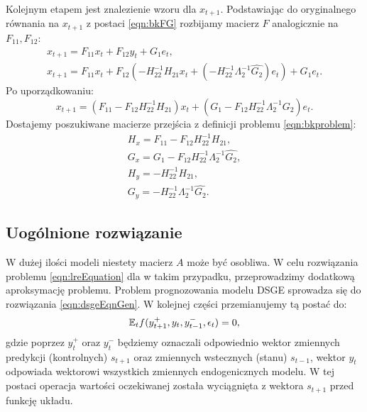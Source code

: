 Kolejnym etapem jest znalezienie wzoru dla $x_{t+1}$. Podstawiając do oryginalnego równania na $x_{t+1}$ z postaci \eqref{eqn:bkFG} rozbijamy macierz $F$ analogicznie na $F_{11}, F_{12}$:
\begin{equation}
\begin{gathered}
    x_{t+1} = F_{11} x_t + F_{12} y_t + G_1 e_t, \\
    x_{t+1} = F_{11} x_t + F_{12} (-H_{22}^{-1} H_{21} x_t + (-H_{22}^{-1}\Lambda_2^{-1}\hat{G_2})e_t) + G_1 e_t.
\end{gathered}
\end{equation}
Po uporządkowaniu:
\begin{equation}
    x_{t+1} = (F_{11} - F_{12} H_{22}^{-1} H_{21}) x_t + (G_1 - F_{12} H_{22}^{-1}\Lambda_2^{-1}\hat{G_2}) e_t.
\end{equation}
Dostajemy poszukiwane macierze przejścia z definicji problemu \eqref{eqn:bkproblem}:
\begin{equation}
    \begin{gathered}
        H_x = F_{11} - F_{12} H_{22}^{-1} H_{21},\\
        G_x = G_1 - F_{12} H_{22}^{-1}\Lambda_2^{-1}\hat{G_2},\\
        H_y = -H_{22}^{-1} H_{21},\\
        G_y = -H_{22}^{-1}\Lambda_2^{-1}\hat{G_2}.
    \end{gathered}
\end{equation}

\subsection{Uogólnione rozwiązanie}
\label{sec:general_bk_solution}

W dużej ilości modeli niestety macierz $A$ może być osobliwa. W celu rozwiązania problemu \eqref{eqn:lreEquation} dla w takim przypadku, przeprowadzimy dodatkową aproksymację problemu. Problem prognozowania modelu DSGE sprowadza się do rozwiązania \eqref{eqn:dsgeEqnGen}. W kolejnej części przemianujemy tą postać do:
\begin{equation}
    \label{eqn:genBkProblem}
    \mathbb{E}_t f(y_{t+1}^+, y_t, y_{t-1}^-, \epsilon_t) = 0,
\end{equation}
gdzie poprzez $y_t^+$ oraz $y_t^-$ będziemy oznaczali odpowiednio wektor zmiennych predykcji (kontrolnych) $s_{t+1}$ oraz zmiennych wstecznych (stanu) $s_{t-1}$, wektor $y_t$ odpowiada wektorowi wszystkich zmiennych endogenicznych modelu. W tej postaci operacja wartości oczekiwanej została wyciągnięta z wektora $s_{t+1}$ przed funkcję układu.

